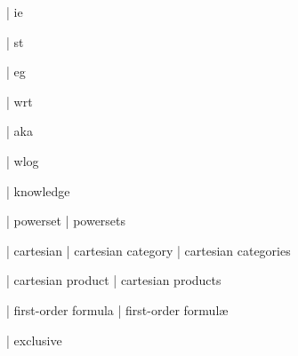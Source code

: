 
  | ie

  | st

  | eg

  | wrt

  | aka

  | wlog


  | knowledge

  | powerset
  | powersets


  | cartesian
  | cartesian category
  | cartesian categories

  | cartesian product
  | cartesian products

  | first-order formula
  | first-order formul\ae{}

  | exclusive

